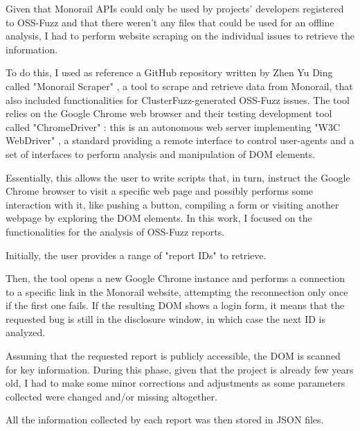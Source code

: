 Given that Monorail APIs could only be used by projects' developers registered to OSS-Fuzz and that there weren't any files that could be used for an offline analysis, I had to perform website scraping on the individual issues to retrieve the information. 

To do this, I used as reference a GitHub repository written by Zhen Yu Ding called "Monorail Scraper" \cite{scraper}, a tool to scrape and retrieve data from Monorail, that also included functionalities for ClusterFuzz-generated OSS-Fuzz issues.
The tool relies on the Google Chrome web browser and their testing development tool called "ChromeDriver" \cite{driver}: this is an autonomous web server implementing "W3C WebDriver" \cite{driver_standard}, a standard providing a remote interface to control user-agents and a set of interfaces to perform analysis and manipulation of DOM elements.

Essentially, this allows the user to write scripts that, in turn, instruct the Google Chrome browser to visit a specific web page and possibly performs some interaction with it, like pushing a button, compiling a form or visiting another webpage by exploring the DOM elements.  
In this work, I focused on the functionalities for the analysis of OSS-Fuzz reports.

Initially, the user provides a range of "report IDs" to retrieve.

Then, the tool opens a new Google Chrome instance and performs a connection to a specific link in the Monorail website, attempting the reconnection only once if the first one fails. If the resulting DOM shows a login form, it means that the requested bug is still in the disclosure window, in which case the next ID is analyzed.

Assuming that the requested report is publicly accessible, the DOM is scanned for key information.
During this phase, given that the project is already few years old, I had to make some minor corrections and adjustments as some parameters collected were changed and/or missing altogether.

All the information collected by each report was then stored in JSON files.

